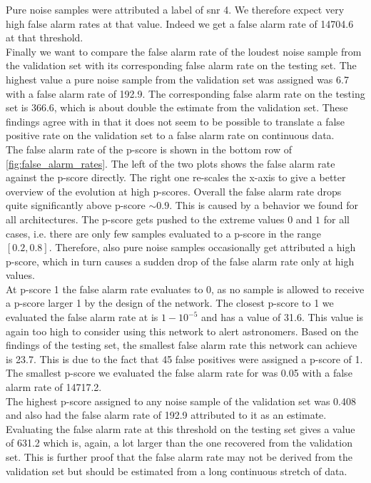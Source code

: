 Pure noise samples were attributed a label of \gls{snr} 4. We therefore expect very high false alarm rates at that value. Indeed we get a false alarm rate of 14704.6 at that threshold.\\
Finally we want to compare the false alarm rate of the loudest noise sample from the validation set with its corresponding false alarm rate on the testing set. The highest value a pure noise sample from the validation set was assigned was 6.7 with a false alarm rate of 192.9. The corresponding false alarm rate on the testing set is 366.6, which is about double the estimate from the validation set. These findings agree with \cite{cnn_magiacal_bullet} in that it does not seem to be possible to translate a false positive rate on the validation set to a false alarm rate on continuous data.\smallskip\\
The false alarm rate of the p-score is shown in the bottom row of \autoref{fig:false_alarm_rates}. The left of the two plots shows the false alarm rate against the p-score directly. The right one re-scales the x-axis to give a better overview of the evolution at high p-scores. Overall the false alarm rate drops quite significantly above p-score $\sim 0.9$. This is caused by a behavior we found for all architectures. The p-score gets pushed to the extreme values $0$ and $1$ for all cases, i.e. there are only few samples evaluated to a p-score in the range $\left[0.2,0.8\right]$. Therefore, also pure noise samples occasionally get attributed a high p-score, which in turn causes a sudden drop of the false alarm rate only at high values.\\
At p-score 1 the false alarm rate evaluates to 0, as no sample is allowed to receive a p-score larger 1 by the design of the network. The closest p-score to 1 we evaluated the false alarm rate at is $1-10^{-5}$ and has a value of 31.6. This value is again too high to consider using this network to alert astronomers. Based on the findings of the testing set, the smallest false alarm rate this network can achieve is 23.7. This is due to the fact that 45 false positives were assigned a p-score of 1. The smallest p-score we evaluated the false alarm rate for was 0.05 with a false alarm rate of 14717.2.\\
The highest p-score assigned to any noise sample of the validation set was 0.408 and also had the false alarm rate of 192.9 attributed to it as an estimate. Evaluating the false alarm rate at this threshold on the testing set gives a value of 631.2 which is, again, a lot larger than the one recovered from the validation set. This is further proof that the false alarm rate may not be derived from the validation set but should be estimated from a long continuous stretch of data.
